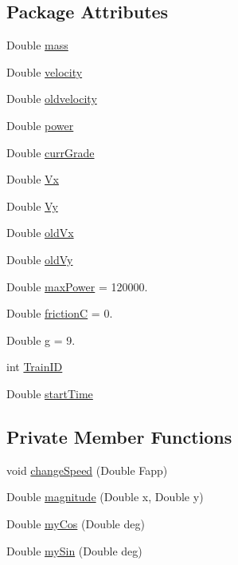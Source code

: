 \subsection*{Package Attributes}
\begin{DoxyCompactItemize}
\item 
Double \hyperlink{classtrainModel_1_1Train_a81b0e04517e168bb5381c165ae068210}{mass}
\item 
Double \hyperlink{classtrainModel_1_1Train_ae0f4175c59c12b888c12587a7c64768e}{velocity}
\item 
Double \hyperlink{classtrainModel_1_1Train_ae03291f43c83952e1452fc0d4031fd16}{oldvelocity}
\item 
Double \hyperlink{classtrainModel_1_1Train_ad650d5136222ba3bdf3272f7ea908ab8}{power}
\item 
Double \hyperlink{classtrainModel_1_1Train_a5b231e967030c5143f13efe7b993751c}{curr\+Grade}
\item 
Double \hyperlink{classtrainModel_1_1Train_ad934166ba4e535a033771eaa5b758c42}{Vx}
\item 
Double \hyperlink{classtrainModel_1_1Train_a60dfaef269a503c72700a405a1ba465e}{Vy}
\item 
Double \hyperlink{classtrainModel_1_1Train_aa81f6ae6deb7fb21c94d8af2b37c61f7}{old\+Vx}
\item 
Double \hyperlink{classtrainModel_1_1Train_a0fc26e7ed97d3d83749fe5fa1156812d}{old\+Vy}
\item 
Double \hyperlink{classtrainModel_1_1Train_aeb7f280cf048608f22c6c0ec8544b7c0}{max\+Power} = 120000.
\item 
Double \hyperlink{classtrainModel_1_1Train_aa660ffb9dcd63059f8e9e3c282ae5cae}{frictionC} = 0.
\item 
Double \hyperlink{classtrainModel_1_1Train_a163d398b8467040f820386cff418e8ac}{g} = 9.
\item 
int \hyperlink{classtrainModel_1_1Train_af258aa71b69e7f7878164cb40d0422ab}{Train\+ID}
\item 
Double \hyperlink{classtrainModel_1_1Train_ab498b674cbe1209d6903ff1d79c600e8}{start\+Time}
\end{DoxyCompactItemize}
\subsection*{Private Member Functions}
\begin{DoxyCompactItemize}
\item 
void \hyperlink{classtrainModel_1_1Train_a1ab142928b7f173d3593a2482c3fcdec}{change\+Speed} (Double Fapp)
\item 
Double \hyperlink{classtrainModel_1_1Train_a0eabada19eac6142f2f174109de8551a}{magnitude} (Double x, Double y)
\item 
Double \hyperlink{classtrainModel_1_1Train_affdb8691217f966a1cd2cbbeda59b005}{my\+Cos} (Double deg)
\item 
Double \hyperlink{classtrainModel_1_1Train_a4a42a9493ba183b960f3e92fe2430475}{my\+Sin} (Double deg)
\end{DoxyCompactItemize}


